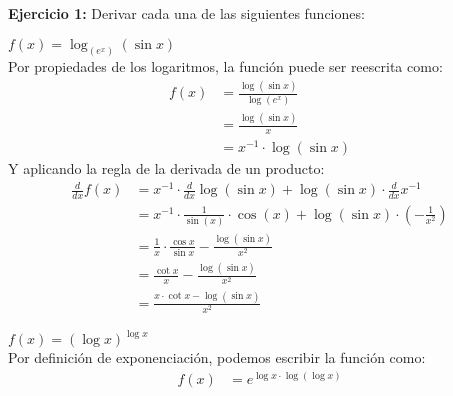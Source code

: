 \documentclass[../main.tex]{subfiles}
\begin{document}
\question \textbf{Ejercicio 1:} Derivar cada una de las siguientes funciones:
\begin{partes}
    \parte $f(x) = \log_{(e^x)} (\sin x)$\\
    Por propiedades de los logaritmos, la función puede ser reescrita como:
    \begin{align*}
        f(x) &= \frac{\log(\sin x)}{\log(e^x)}\\
        &= \frac{\log(\sin x)}{x}\\
        &= x^{-1} \cdot \log(\sin x)
    \end{align*}
    Y aplicando la regla de la derivada de un producto:
    \begin{align*}
        \frac{d}{dx} f(x) &= x^{-1} \cdot \frac{d}{dx} \log(\sin x) + \log(\sin x) \cdot \frac{d}{dx} x^{-1}\\
        &= x^{-1} \cdot \frac{1}{\sin(x)}\cdot \cos(x) + \log(\sin x) \cdot \left(-\frac{1}{x^2}\right)\\
        &= \frac{1}{x} \cdot \frac{\cos x}{\sin x} - \frac{\log(\sin x)}{x^2}\\
        &= \frac{\cot x}{x} - \frac{\log(\sin x)}{x^2}\\
        &= \frac{x\cdot \cot x - \log(\sin x)}{x^2}
    \end{align*}

    \parte $f(x) = (\log x)^{\log x}$\\
    Por definición de exponenciación, podemos escribir la función como:
    \begin{align*}
        f(x) &= e^{\log x \cdot \log(\log x)}
    \end{align*}
\end{partes}
\end{document}
